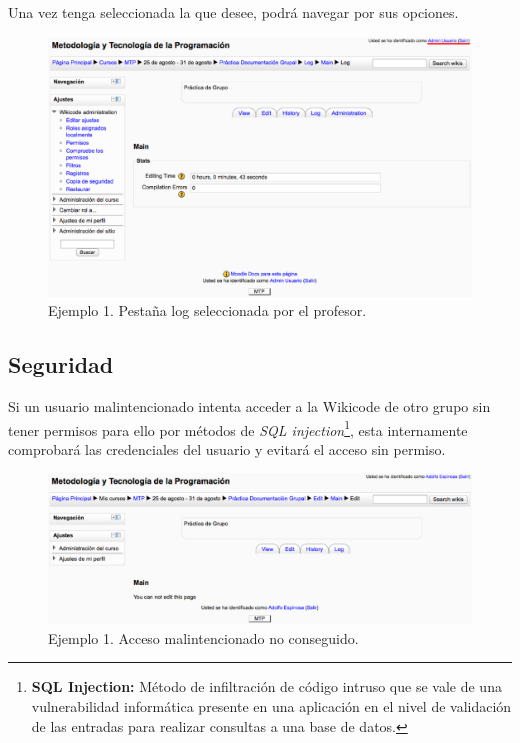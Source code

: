 \newpage

Una vez tenga seleccionada la que desee, podrá navegar por sus opciones.

\begin{figure}[h]
	\label{fig:ej1log}
	\includegraphics[width=\textwidth]{./img/ej1log.eps}
	\caption{Ejemplo 1. Pestaña log seleccionada por el profesor.}
\end{figure}

\newpage

\subsection{Seguridad}

Si un usuario malintencionado intenta acceder a la Wikicode de otro grupo sin tener permisos para ello por métodos de \emph{SQL injection}\footnote{\textbf{SQL Injection:} Método de infiltración de código intruso que se vale de una vulnerabilidad informática presente en una aplicación en el nivel de validación de las entradas para realizar consultas a una base de datos.}, esta internamente comprobará las credenciales del usuario y evitará el acceso sin permiso.

\begin{figure}[h]
	\label{fig:ej1security}
	\includegraphics[width=\textwidth]{./img/ej1security.eps}
	\caption{Ejemplo 1. Acceso malintencionado no conseguido.}
\end{figure}

